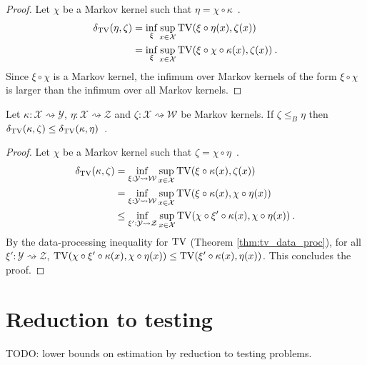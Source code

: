 \begin{proof}%
\uses{}
Let $\chi$ be a Markov kernel such that $\eta = \chi \circ \kappa$~.
\begin{align*}
\delta_{\operatorname{TV}}(\eta, \zeta)
&= \inf_{\xi} \sup_{x \in \mathcal X} \operatorname{TV}(\xi \circ \eta (x), \zeta(x))
\\
&= \inf_\xi \sup_{x \in \mathcal X} \operatorname{TV}(\xi \circ \chi \circ \kappa (x), \zeta(x))
\: .
\end{align*}
Since $\xi \circ \chi$ is a Markov kernel, the infimum over Markov kernels of the form $\xi \circ \chi$ is larger than the infimum over all Markov kernels.
\end{proof}

\begin{lemma}
  \label{lem:deficiency_mono_right}
  Let $\kappa: \mathcal X \rightsquigarrow \mathcal Y$, $\eta : \mathcal X \rightsquigarrow \mathcal Z$ and $\zeta : \mathcal X \rightsquigarrow \mathcal W$ be Markov kernels.
  If $\zeta \le_B \eta$ then $\delta_{\operatorname{TV}}(\kappa, \zeta) \le \delta_{\operatorname{TV}}(\kappa, \eta)$~.
\end{lemma}

\begin{proof}%
{}
Let $\chi$ be a Markov kernel such that $\zeta = \chi \circ \eta$~.
\begin{align*}
\delta_{\operatorname{TV}}(\kappa, \zeta)
&= \inf_{\xi : \mathcal Y \rightsquigarrow \mathcal W} \sup_{x \in \mathcal X} \operatorname{TV}(\xi \circ \kappa (x), \zeta(x))
\\
&= \inf_{\xi : \mathcal Y \rightsquigarrow \mathcal W} \sup_{x \in \mathcal X} \operatorname{TV}(\xi \circ \kappa (x), \chi \circ \eta(x))
\\
&\le \inf_{\xi' : \mathcal Y \rightsquigarrow \mathcal Z} \sup_{x \in \mathcal X} \operatorname{TV}(\chi \circ \xi' \circ \kappa (x), \chi \circ \eta(x))
\: .
\end{align*}
By the data-processing inequality for $\operatorname{TV}$ (Theorem \ref{thm:tv_data_proc}), for all $\xi' : \mathcal Y \rightsquigarrow \mathcal Z$, $\operatorname{TV}(\chi \circ \xi' \circ \kappa (x), \chi \circ \eta(x)) \le \operatorname{TV}(\xi' \circ \kappa (x), \eta(x))$.
This concludes the proof.
\end{proof}

\section{Reduction to testing}

TODO: lower bounds on estimation by reduction to testing problems.